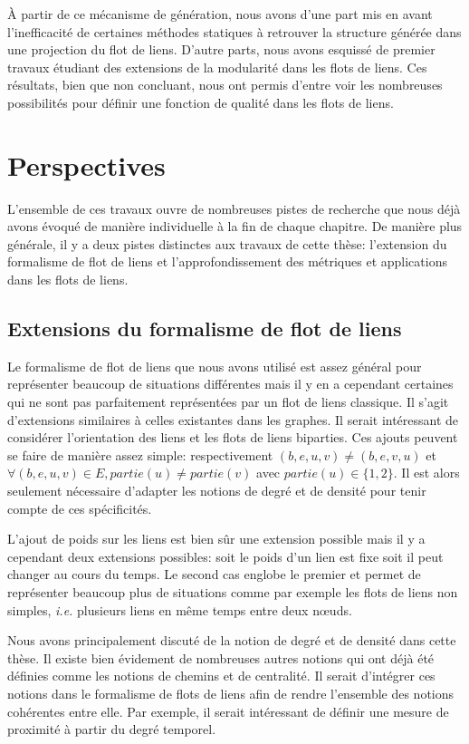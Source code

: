 \`A partir de ce mécanisme de génération, nous avons d'une part mis en avant l'inefficacité de certaines méthodes statiques à retrouver la structure générée dans une projection du flot de liens.
D'autre parts, nous avons esquissé de premier travaux étudiant des extensions de la modularité dans les flots de liens.
Ces résultats, bien que non concluant, nous ont permis d'entre voir les nombreuses possibilités pour définir une fonction de qualité dans les flots de liens.

\section{Perspectives}

L'ensemble de ces travaux ouvre de nombreuses pistes de recherche que nous déjà avons évoqué de manière individuelle à la fin de chaque chapitre.
De manière plus générale, il y a deux pistes distinctes aux travaux de cette thèse: l'extension du formalisme de flot de liens et l'approfondissement des métriques et applications dans les flots de liens.

\subsection{Extensions du formalisme de flot de liens}

Le formalisme de flot de liens que nous avons utilisé est assez général pour représenter beaucoup de situations différentes mais il y en a cependant certaines qui ne sont pas parfaitement représentées par un flot de liens classique.
Il s'agit d'extensions similaires à celles existantes dans les graphes.
Il serait intéressant de considérer l'orientation des liens et les flots de liens biparties.
Ces ajouts peuvent se faire de manière assez simple: respectivement $(b,e,u,v)\neq (b,e,v,u)$ et $\forall (b,e,u,v) \in E, partie(u)\neq partie(v)$ avec $partie(u) \in \{1,2\}$.
Il est alors seulement nécessaire d'adapter les notions de degré et de densité pour tenir compte de ces spécificités.

L'ajout de poids sur les liens est bien sûr une extension possible mais il y a cependant deux extensions possibles: soit le poids d'un lien est fixe soit il peut changer au cours du temps.
Le second cas englobe le premier et permet de représenter beaucoup plus de situations comme par exemple les flots de liens non simples, \emph{i.e.} plusieurs liens en même temps entre deux n\oe uds.

Nous avons principalement discuté de la notion de degré et de densité dans cette thèse.
Il existe bien évidement de nombreuses autres notions qui ont déjà été définies comme les notions de chemins et de centralité.
Il serait d'intégrer ces notions dans le formalisme de flots de liens afin de rendre l'ensemble des notions cohérentes entre elle.
Par exemple, il serait intéressant de définir une mesure de proximité à partir du degré temporel.


